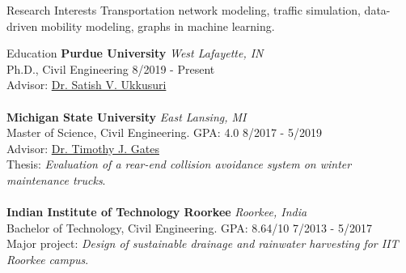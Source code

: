 \documentclass{resume} %
\begin{document}
\begin{rSection}{Research Interests}
    Transportation network modeling, traffic simulation, data-driven mobility modeling, graphs in machine learning.
\end{rSection}

\begin{rSection}{Education}
    {\bf Purdue University} \hfill {\em West Lafayette, IN} 
    \\ Ph.D., Civil Engineering \hfill {8/2019 - Present}
    \\ Advisor: \href{http://www.satishukkusuri.com/}{Dr. Satish V. Ukkusuri} \\
    \\ {\bf Michigan State University} \hfill {\em East Lansing, MI} 
    \\ Master of Science, Civil Engineering. GPA: 4.0 \hfill {8/2017 - 5/2019}
    \\ Advisor: \href{https://www.egr.msu.edu/people/profile/gatestim}{Dr. Timothy J. Gates}
    \\ Thesis: \emph{Evaluation of a rear-end collision avoidance system on winter maintenance trucks}. \\
    \\ {\bf Indian Institute of Technology Roorkee} \hfill {\em Roorkee, India}
    \\ Bachelor of Technology, Civil Engineering. GPA: 8.64/10 \hfill {7/2013 - 5/2017}
    \\ Major project: \emph{Design of sustainable drainage and rainwater harvesting for IIT Roorkee campus}.
\end{rSection}
\end{document}
